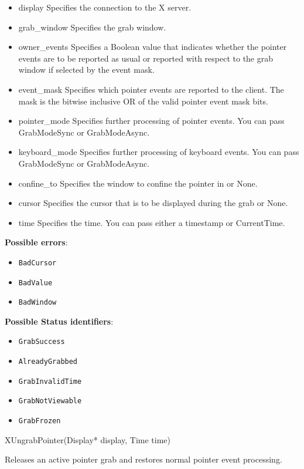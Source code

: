 \documentclass{report}
\begin{document}
\begin{itemize}
        \begin{itemize}
            \item display Specifies the connection to the X server.
            \item grab\_window Specifies the grab window.
            \item owner\_events Specifies a Boolean value that indicates whether the pointer events are to be reported as usual or reported with respect to the grab window if selected by the event mask.
            \item event\_mask Specifies which pointer events are reported to the client. The mask is the bitwise inclusive OR of the valid pointer event mask bits.
            \item pointer\_mode Specifies further processing of pointer events. You can pass GrabModeSync or GrabModeAsync.
            \item keyboard\_mode Specifies further processing of keyboard events. You can pass GrabModeSync or GrabModeAsync.
            \item confine\_to Specifies the window to confine the pointer in or None.
            \item cursor Specifies the cursor that is to be displayed during the grab or None.
            \item time Specifies the time. You can pass either a timestamp or CurrentTime.
        \end{itemize}

        \textbf{Possible errors}:
        \begin{itemize}
            \item \texttt{BadCursor}
            \item \texttt{BadValue}
            \item \texttt{BadWindow}
        \end{itemize}

        \textbf{Possible Status identifiers}:
        \begin{itemize}
            \item \texttt{GrabSuccess}
            \item \texttt{AlreadyGrabbed}
            \item \texttt{GrabInvalidTime}
            \item \texttt{GrabNotViewable}
            \item \texttt{GrabFrozen}
        \end{itemize}

        \begin{cppcode}
            XUngrabPointer(Display* display, Time time)
        \end{cppcode}
        \bigbreak \noindent
        Releases an active pointer grab and restores normal pointer event processing.


\end{itemize}
\end{document}
